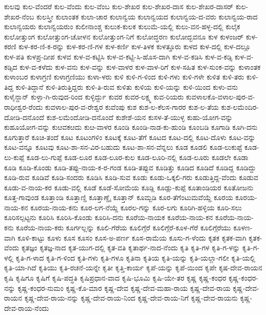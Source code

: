 ಕುಲವು
ಕುಲ-ವೆಂದರೆ
ಕುಲ-ವೆಂದು
ಕುಲ-ವೆಂಬ
ಕುಲ-ಶೇಖರ
ಕುಲ-ಶೇಖರ-ದಾಸ
ಕುಲ-ಶೇಖರ-ದಾಸರ್
ಕುಲ-ಶೇಖರ-ನೆಂಬ
ಕುಲಸ್ತ್ರೀ
ಕುಲಾಂತಕ
ಕುಲಾ-ಚಾರ
ಕುಲಾನ್ವಯ
ಕುಲಾನ್ವಯದ
ಕುಲಾನ್ವಯ-ದ-ವರು
ಕುಲಾನ್ವಯ-ರಾದ
ಕುಲಾನ್ವಯರು
ಕುಲಾನ್ವಯರುಂ
ಕುಲೀನಾಂಶ್ಚ
ಕುಲುಕ-ಕುಲಕ
ಕುಲುಮೆ-ಯಲ್ಲಿ
ಕುಲು-ವನ-ಹಳ್ಳ-ದಲ್ಲಿ
ಕುಲೈಕ
ಕುಲೋತ್ತುಂಗ
ಕುಲೋತ್ತುಂಗ-ಚೋಳನ
ಕುಲೋತ್ತುಂಗ-ನಿಗೆ
ಕುಲೋದ್ಧರಣ
ಕುಲೋದ್ಭವನೂ
ಕುಳ
ಕುಳಂಜರ್
ಕುಳ-ಕರಣಿ
ಕುಳ-ಕರ-ಣಿ-ಕ-ರನ್ನು
ಕುಳ-ಕರ-ಣಿ-ಗಳ
ಕುಳ-ಕರ್ಣಿ
ಕುಳ-ತಿಳಕ
ಕುಳತ್ತೂರು
ಕುಳದ
ಕುಳ-ದಲ್ಲಿ
ಕುಳ-ದಲ್ಲೂ
ಕುಳ-ಪತಿ
ಕುಳಪ್ರ-ದೀಪ
ಕುಳವ
ಕುಳ-ವ-ಕಟ್ಟಿಸಿ
ಕುಳ-ವ-ಕಟ್ಟಿ-ಸಿ-ಹೊಸ-ದಾಗಿ
ಕುಳ-ವ-ಕಡಿಸಿ
ಕುಳ-ವ-ಕಡ್ಸಿ
ಕುಳ-ವ-ಕಡ್ಸಿದ
ಕುಳ-ವ-ಕಳೆದು
ಕುಳ-ವನು
ಕುಳ-ವನ್ನು
ಕುಳ-ವಾಳರ
ಕುಳ-ವಾಳ-ರಿಗೆ
ಕುಳ-ಸಹಿತ
ಕುಳ-ಸುಂಕ-ವನ್ನು
ಕುಳಾಂತಕ
ಕುಳಾಂಬರ
ಕುಳಾಗ್ರಣಿ
ಕುಳಾಗ್ರಣಿಯು
ಕುಳಾ-ಳರು
ಕುಳಿ
ಕುಳಿ-ಗ-ಳಿಂದ
ಕುಳಿ-ಗಳು
ಕುಳಿ-ಗಳೇ
ಕುಳಿತ
ಕುಳಿ-ತರು
ಕುಳಿ-ತಿದ್ದ
ಕುಳಿ-ತಿದ್ದಾನೆ
ಕುಳಿ-ತಿರುತ್ತಿದ್ದರು
ಕುಳಿ-ತಿ-ರುವ
ಕುಳಿತು
ಕುಳಿಯ
ಕುಳಿ-ಯನ್ನು
ಕುಳಿ-ಯಿಂದ
ಕುಳು-ವನು
ಕುಳೈನ್ದಾನ್
ಕುಳ್ಳಾ-ಗಿ-ರುವುದ-ರಿಂದ
ಕುಳ್ಳಿರ್ದ್ದು
ಕುವರ
ಕುವರ-ಲಕ್ಷ್ಮ
ಕುವ-ರಿಯರು
ಕುವಳಾಲಕೊ-ವಳಾಲ-ಪುರ-ವ-ರಾಧೀಶ್ವರ-ರೆಂದು
ಕುವಳಾಲ-ಪುರ-ವ-ರೇಶ್ವರ
ಕುವೆಂಪು
ಕುಶ
ಕುಶ-ಲ-ಕೆಲಸ-ಗಾರರ
ಕುಶ-ಲ-ತೆಯ
ಕುಶ-ಲಮೆಂದಿರ-ದೋಡಿ-ದನೊಂದೆ
ಕುಶ-ಲಮೆಂದೋಡಿ-ದನೊಂದೆ
ಕುಶೇಶೆ-ಯನ
ಕುಸಳ-ತೆ-ಯುಳ್ಳ
ಕುಹು-ಯೋಗ-ವನ್ನು
ಕುಹೂಯೋಗ-ವನ್ನು
ಕುೞವಕೞದು
ಕುೞ-ವಾಳರ
ಕೂಂಡಿ
ಕೂಂಡಿ-ನಾಡ-ಕು-ಹುಂಡಿ
ಕೂಂಬಡಿ
ಕೂಗಾಡಿ
ಕೂಗಿ-ದನು
ಕೂಗುತ್ತಾರೆ
ಕೂಚಿ-ತಂದೆ
ಕೂಟ
ಕೂಟಂಗಳಿಂ
ಕೂಟಕ್ಕೆ
ಕೂಟ-ತೆಗೆ
ಕೂಟದ
ಕೂಟ-ದಲ್ಲಿ
ಕೂಟ-ದೊಳು
ಕೂಟ-ವನ್ನು
ಕೂಟ-ವನ್ನೂ
ಕೂಟವು
ಕೂಟ-ಶಾ-ಸನ-ವಿರ-ಬಹುದು
ಕೂಟ-ಶಾ-ಸನ-ವೆನ್ನಲು
ಕೂಡ
ಕೂಡಲಿ
ಕೂಡ-ಲುಕುಪ್ಟೆ
ಕೂಡ-ಲು-ಕುಪ್ಪೆ
ಕೂಡ-ಲು-ಗುಪ್ಪೆ
ಕೂಡ-ಲೂರ
ಕೂಡ-ಲೂರ-ಕುಲ
ಕೂಡ-ಲೂರಿ-ನಲ್ಲಿ
ಕೂಡ-ಲೂರು
ಕೂಡಲೇ
ಕೂಡಾ
ಕೂಡಿ
ಕೂಡಿ-ಕೊಂಡು
ಕೂಡಿ-ತಪ್ಪು-ನಾಯ-ಕ-ರ-ಗಂಡ
ಕೂಡಿ-ತಪ್ಪುವ
ಕೂಡಿತ್ತು
ಕೂಡಿದ
ಕೂಡಿದೆ
ಕೂಡಿದ್ದ
ಕೂಡಿದ್ದು
ಕೂಡಿ-ರುವ
ಕೂಡಿವೆ
ಕೂಡಿ-ಸಂದರು
ಕೂಡಿಸಿ
ಕೂಡಿ-ಸುವ
ಕೂಡು
ಕೂಡು-ಒಕ್ಕಲಿ-ಗರು
ಕೂಡುತ್ತಿದ್ದ-ವೆಂದು
ಕೂಡುವ
ಕೂಡು-ವ-ನಾಯ-ಕರ
ಕೂಡು-ವಲ್ಲಿ
ಕೂಡೆ
ಕೂಡೆ-ಸೋಮೆಯ
ಕೂಡ್ಲಿ
ಕೂಡ್ಲು-ಕುಪ್ಪೆ
ಕೂತಾಂಡಿಯರ
ಕೂತೋಜನು
ಕೂತ್ತ-ಗಾವುಂಡ
ಕೂತ್ತಾಂಡಿ
ಕೂತ್ತಾಣ್ಡಿ
ಕೂತ್ತಾಣ್ಡೈ
ಕೂತ್ತಾನ್
ಕೂಮ್ಬಡಿ
ಕೂರ-ತೆಗೆಂಟುಮವೆಯ್ದೆ
ಕೂರಯ
ಕೂರಯ-ನಾಯ-ಕನ
ಕೂರಯ-ನಾಯ-ಕನು
ಕೂರ-ಲಗ-ನೆಯ್ದೆ
ಕೂರಲ-ಗನ್ನು
ಕೂರ-ಲಗು
ಕೂರಿಗಿ-ಹಳ್ಳಿಯ
ಕೂರಿ-ಸಲು
ಕೂರಿಸಲ್ಪಟ್ಟನು
ಕೂರಿಸಿ
ಕೂರಿಸಿ-ಕೊಂಡು
ಕೂರಿಸಿ-ದನು
ಕೂರೆಯ-ನಾಯಕ
ಕೂರೆಯ-ನಾಯ-ಕನ
ಕೂರೆಯ-ನಾಯ-ಕನು
ಕೂರೆಯ-ನಾಯ-ಕರು
ಕೂರ್ಗಲ್ಲನ್ನು
ಕೂಲಿ-ಗೆರೆಯ
ಕೂಲಿಗ್ಗೆರೆ
ಕೂಲಿಗ್ಗೆರೆ-ಕೂಳ-ಗೆರೆ
ಕೂಲಿಗ್ಗೆರೆಯು
ಕೂಳಣ-ವಾಗಿ
ಕೂಳಿ-ಕಾಟ್ಟು
ಕೂಳು
ಕೂಸ
ಕೂಸಂ
ಕೂಸ-ಅ-ಪರ್ಣ
ಕೂಸ-ರಾಮೆಯ
ಕೂಸು-ಗ-ಳೆಂದು
ಕೃತಕ
ಕೃತಕ-ವಾಗಿ
ಕೃತಕ-ವೆಂದು
ಕೃತಜ್ಞಂ
ಕೃತಜ್ಞ-ನಾದ
ಕೃತ-ಯುಗ-ದಲ್ಲಿ
ಕೃತ-ವತಿ
ಕೃತಾರ್ಥ-ನಾದ-ನೆಂದು
ಕೃತಿ
ಕೃತಿ-ಗಳ
ಕೃತಿ-ಗ-ಳನ್ನು
ಕೃತಿ-ಗ-ಳಲ್ಲಿ
ಕೃತಿ-ಗ-ಳಾದ
ಕೃತಿ-ಗ-ಳಿಂದ
ಕೃತಿ-ಗಳು
ಕೃತಿ-ಗಳೂ
ಕೃತಿನಾ
ಕೃತಿಯ
ಕೃತಿ-ಯನ್ನು
ಕೃತಿ-ಯಲ್ಲಾ-ಗಲೀ
ಕೃತಿ-ಯಲ್ಲಿ
ಕೃತಿ-ಯಾ-ಗಿದೆ
ಕೃತಿಯು
ಕೃತಿ-ರಚನೆ-ಯನ್ನೇ
ಕೃತೀ
ಕೃತ್ತಿ-ಕಾರ್ಯ
ಕೃಪೆ-ಯನ್ನು
ಕೃಪೆ-ಯಿಂದ
ಕೃಪೇ
ಕೃಷ-ದೇವ-ರಾಯನ
ಕೃಷಿ
ಕೃಷಿಗೂ
ಕೃಷಿಗೆ
ಕೃಷಿ-ಪದ್ಧತಿ
ಕೃಷಿಪ್ರಧಾನ-ವಾದ
ಕೃಷಿ-ಭೂಮಿ
ಕೃಷಿ-ಯೇ-ತರ
ಕೃಷ್ಣ
ಕೃಷ್ಣ-ಕಂಧರ
ಕೃಷ್ಣ-ಕಂಧರ-ನನ್ನು
ಕೃಷ್ಣ-ಕಂಧರ-ನುಮಂ
ಕೃಷ್ಣ-ಕೊ-ಮಾರ
ಕೃಷ್ಣ-ದೇವ
ಕೃಷ್ಣ-ದೇವ-ಮಹಾ-ರಾಯ
ಕೃಷ್ಣ-ದೇವ-ರಾಯ
ಕೃಷ್ಣ-ದೇವ-ರಾಯನ
ಕೃಷ್ಣ-ದೇವ-ರಾಯ-ನನ್ನು
ಕೃಷ್ಣ-ದೇವ-ರಾಯ-ನಿಂದ
ಕೃಷ್ಣ-ದೇವ-ರಾಯ-ನಿಗೆ
ಕೃಷ್ಣ-ದೇವ-ರಾಯನು
ಕೃಷ್ಣ-ದೇವ-ರಾಯ-ನೆಂದು
